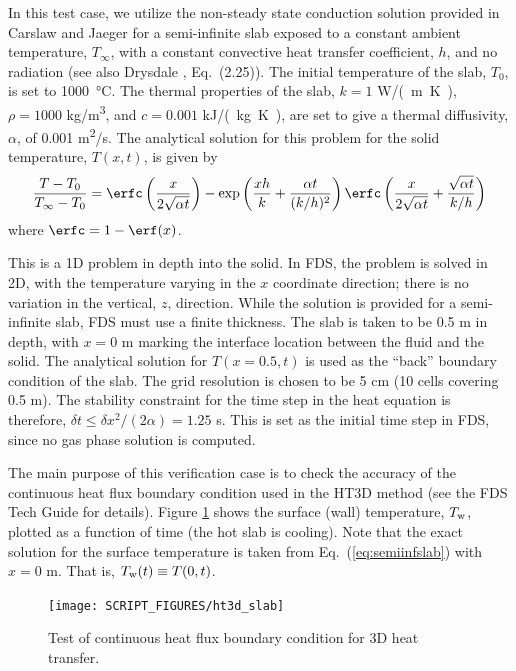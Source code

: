 \documentclass[11pt]{book}
\begin{document}
In this test case, we utilize the non-steady state conduction solution provided in Carslaw and Jaeger \cite{Carslaw:1} for a semi-infinite slab exposed to a constant ambient temperature, $T_\infty$, with a constant convective heat transfer coefficient, $h$, and no radiation (see also Drysdale \cite{Drysdale:1}, Eq.~(2.25)).  The initial temperature of the slab, $T_0$, is set to \SI{1000}{\degreeCelsius}. The thermal properties of the slab, $k=1$ \si{W/(m.K)}, $\rho=1000$ \si{kg/m^3}, and $c=0.001$ \si{kJ/(kg.K)}, are set to give a thermal diffusivity, $\alpha$, of 0.001 \si{m^2/s}. The analytical solution for this problem for the solid temperature, $T(x,t)$, is given by
\begin{equation}
\label{eq:semiinfslab}
\frac{T - T_0}{T_\infty - T_0} = \erfc\left(\frac{x}{2\sqrt{\alpha t}}\right) - \exp\left( \frac{xh}{k} + \frac{\alpha t}{(k/h)^2} \right) \erfc\left( \frac{x}{2\sqrt{\alpha t}} + \frac{\sqrt{\alpha t}}{k/h} \right)
\end{equation}
where $\erfc = 1 - \erf(x)$.

This is a 1D problem in depth into the solid.  In FDS, the problem is solved in 2D, with the temperature varying in the $x$ coordinate direction; there is no variation in the vertical, $z$, direction.  While the solution is provided for a semi-infinite slab, FDS must use a finite thickness.  The slab is taken to be 0.5 m in depth, with $x=0$ m marking the interface location between the fluid and the solid.  The analytical solution for $T(x=0.5,t)$ is used as the ``back'' boundary condition of the slab.  The grid resolution is chosen to be 5 cm (10 cells covering 0.5 m).  The stability constraint for the time step in the heat equation is therefore, $\delta t \le \delta x^2/(2\alpha) = 1.25$ s.  This is set as the initial time step in FDS, since no gas phase solution is computed.

The main purpose of this verification case is to check the accuracy of the continuous heat flux boundary condition used in the HT3D method (see the FDS Tech Guide \cite{FDS_Math_Guide} for details).  Figure \ref{fig:ht3d_slab} shows the surface (wall) temperature, $T_{\rm w}$, plotted as a function of time (the hot slab is cooling).  Note that the exact solution for the surface temperature is taken from Eq.~(\ref{eq:semiinfslab}) with $x=0$ m.  That is, $T_{\rm w}(t) \equiv T(0,t)$.

\begin{figure}[ht]
\centering
\texttt{[image: SCRIPT\_FIGURES/ht3d\_slab]}
\caption[The  test cases]{Test of continuous heat flux boundary condition for 3D heat transfer.}
\label{fig:ht3d_slab}
\end{figure}
\end{document}
